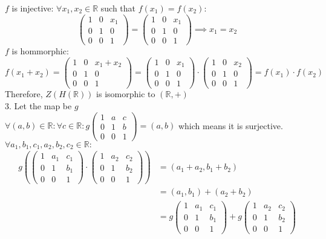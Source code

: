 \documentclass[11pt]{article}
\begin{document}
$f$ is injective: $\forall  x_1, x_2 \in \mathbb{R}$ such that $f(x_1) = f(x_2)$:
\[
\begin{pmatrix}
1 & 0 & x_1 \\
0 & 1 & 0 \\
0 & 0 & 1
\end{pmatrix}=
\begin{pmatrix}
1 & 0 & x_1 \\
0 & 1 & 0 \\
0 & 0 & 1
\end{pmatrix}
\implies x_1 = x_2
\]
$f$ is hommorphic: \\
$f(x_1 + x_2) = 
\begin{pmatrix}
1 & 0 & x_1+x_2 \\
0 & 1 & 0 \\
0 & 0 & 1
\end{pmatrix} = 
\begin{pmatrix}
1 & 0 & x_1 \\
0 & 1 & 0 \\
0 & 0 & 1
\end{pmatrix} \cdot
\begin{pmatrix}
1 & 0 & x_2 \\
0 & 1 & 0 \\
0 & 0 & 1
\end{pmatrix} =
f(x_1) \cdot f(x_2)$
Therefore, $Z(H(\mathbb{R}))$ is isomorphic to $(\mathbb{R}, +)$ \\
3. Let the map be $g$\\ 
$\forall (a,b) \in \mathbb{R}: \forall c \in \mathbb{R}: 
g\begin{pmatrix}
1 & a & c \\
0 & 1 & b \\
0 & 0 & 1
\end{pmatrix} = (a,b)
$ which means it is surjective. \\
$\forall a_1,b_1,c_1,a_2,b_2,c_2 \in \mathbb{R}:$ \\
\begin{equation*}
\begin{aligned}
g \left( 
\begin{pmatrix}
1 & a_1 & c_1 \\
0 & 1 & b_1 \\
0 & 0 & 1
\end{pmatrix} 
\cdot 
\begin{pmatrix}
1 & a_2 & c_2 \\
0 & 1 & b_2 \\
0 & 0 & 1
\end{pmatrix}\right) &= (a_1 + a_2, b_1 + b_2) \\
&= (a_1,b_1) + (a_2 + b_2) \\
&= g 
\begin{pmatrix}
1 & a_1 & c_1 \\
0 & 1 & b_1 \\
0 & 0 & 1
\end{pmatrix} 
+ g 
\begin{pmatrix}
1 & a_2 & c_2 \\
0 & 1 & b_2 \\
0 & 0 & 1
\end{pmatrix}
\end{aligned}
\end{equation*}
\end{document}
